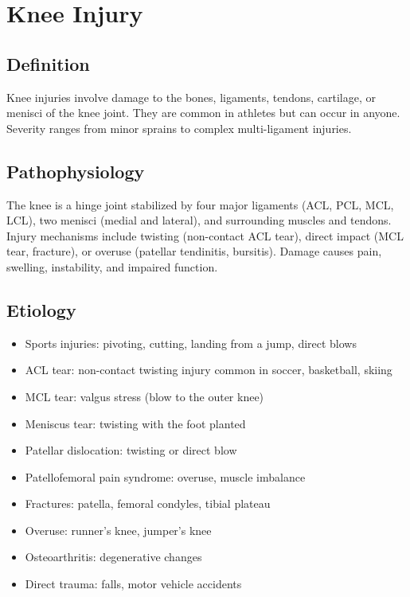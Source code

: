 \chapter{Knee Injury}

\section{Definition}
Knee injuries involve damage to the bones, ligaments, tendons, cartilage, or menisci of the knee joint. They are common in athletes but can occur in anyone. Severity ranges from minor sprains to complex multi-ligament injuries.

\section{Pathophysiology}
The knee is a hinge joint stabilized by four major ligaments (ACL, PCL, MCL, LCL), two menisci (medial and lateral), and surrounding muscles and tendons. Injury mechanisms include twisting (non-contact ACL tear), direct impact (MCL tear, fracture), or overuse (patellar tendinitis, bursitis). Damage causes pain, swelling, instability, and impaired function.

\section{Etiology}
\begin{itemize}
\item Sports injuries: pivoting, cutting, landing from a jump, direct blows
\item ACL tear: non-contact twisting injury common in soccer, basketball, skiing
\item MCL tear: valgus stress (blow to the outer knee)
\item Meniscus tear: twisting with the foot planted
\item Patellar dislocation: twisting or direct blow
\item Patellofemoral pain syndrome: overuse, muscle imbalance
\item Fractures: patella, femoral condyles, tibial plateau
\item Overuse: runner's knee, jumper's knee
\item Osteoarthritis: degenerative changes
\item Direct trauma: falls, motor vehicle accidents
\end{itemize}

